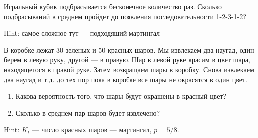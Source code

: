 \begin{problem}
Игральный кубик подбрасывается бесконечное количество раз. Сколько подбрасываний в среднем пройдет до появления последовательности 1-2-3-1-2?

\begin{sol}

Hint: самое сложное тут — подходящий мартингал
\end{sol}
\end{problem}

\begin{problem}
В коробке лежат 30 зеленых и 50 красных шаров. Мы извлекаем два наугад, один берем в левую руку, другой — в правую. Шар в левой руке красим в цвет шара, находящегося в правой руке. Затем возвращаем шары в коробку. Снова извлекаем два наугад и т.д. до тех пор пока в коробке все шары не окрасятся в один цвет.
\begin{enumerate}
\item  Какова вероятность того, что шары будут окрашены в красный цвет?
\item  Сколько в среднем пар шаров будет извлечено?
\end{enumerate}


\begin{sol}

Hint: $K_{t}$ — число красных шаров — мартингал, $p=5/8$.
\end{sol}
\end{problem}





